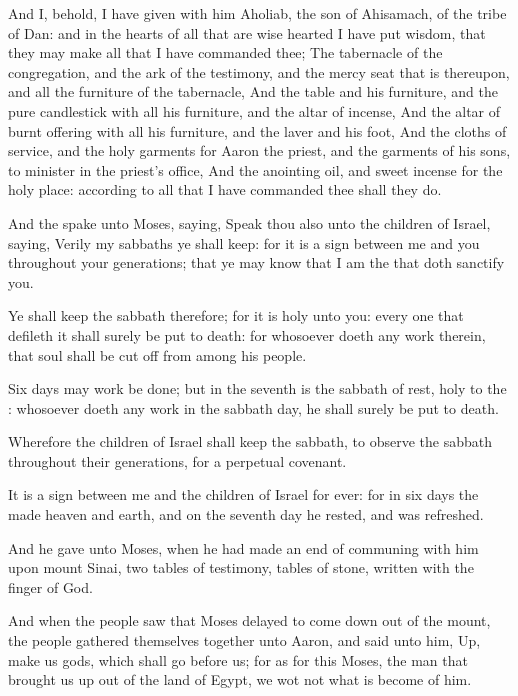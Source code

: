 \Verse And I, behold, I have given with him Aholiab, the son of Ahisamach, of the tribe of Dan: and in the hearts of all that are wise hearted I have put wisdom, that they may make all that I have commanded thee; \Verse The tabernacle of the congregation, and the ark of the testimony, and the mercy seat that is thereupon, and all the furniture of the tabernacle, \Verse And the table and his furniture, and the pure candlestick with all his furniture, and the altar of incense, \Verse And the altar of burnt offering with all his furniture, and the laver and his foot, \Verse And the cloths of service, and the holy garments for Aaron the priest, and the garments of his sons, to minister in the priest's office, \Verse And the anointing oil, and sweet incense for the holy place: according to all that I have commanded thee shall they do.

\Verse And the \LORD spake unto Moses, saying, \Verse Speak thou also unto the children of Israel, saying, Verily my sabbaths ye shall keep: for it is a sign between me and you throughout your generations; that ye may know that I am the \LORD that doth sanctify you.

\Verse Ye shall keep the sabbath therefore; for it is holy unto you: every one that defileth it shall surely be put to death: for whosoever doeth any work therein, that soul shall be cut off from among his people.

\Verse Six days may work be done; but in the seventh is the sabbath of rest, holy to the \LORD: whosoever doeth any work in the sabbath day, he shall surely be put to death.

\Verse Wherefore the children of Israel shall keep the sabbath, to observe the sabbath throughout their generations, for a perpetual covenant.

\Verse It is a sign between me and the children of Israel for ever: for in six days the \LORD made heaven and earth, and on the seventh day he rested, and was refreshed.

\Verse And he gave unto Moses, when he had made an end of communing with him upon mount Sinai, two tables of testimony, tables of stone, written with the finger of God.

\Chapter
\Verse And when the people saw that Moses delayed to come down out of the mount, the people gathered themselves together unto Aaron, and said unto him, Up, make us gods, which shall go before us; for as for this Moses, the man that brought us up out of the land of Egypt, we wot not what is become of him.

